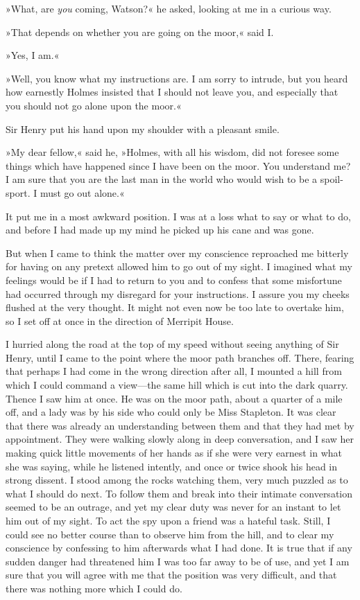 »What, are \emph{you} coming, Watson?« he asked, looking at me in a curious way.

»That depends on whether you are going on the moor,« said I.

»Yes, I am.«

»Well, you know what my instructions are. I am sorry to intrude, but you heard how earnestly Holmes insisted that I should not leave you, and especially that you should not go alone upon the moor.«

Sir Henry put his hand upon my shoulder with a pleasant smile.

»My dear fellow,« said he, »Holmes, with all his wisdom, did not foresee some things which have happened since I have been on the moor. You understand me? I am sure that you are the last man in the world who would wish to be a spoil-sport. I must go out alone.«

It put me in a most awkward position. I was at a loss what to say or what to do, and before I had made up my mind he picked up his cane and was gone.

But when I came to think the matter over my conscience reproached me bitterly for having on any pretext allowed him to go out of my sight. I imagined what my feelings would be if I had to return to you and to confess that some misfortune had occurred through my disregard for your instructions. I assure you my cheeks flushed at the very thought. It might not even now be too late to overtake him, so I set off at once in the direction of Merripit House.

I hurried along the road at the top of my speed without seeing anything of Sir Henry, until I came to the point where the moor path branches off. There, fearing that perhaps I had come in the wrong direction after all, I mounted a hill from which I could command a view\allowbreak---\allowbreak the same hill which is cut into the dark quarry. Thence I saw him at once. He was on the moor path, about a quarter of a mile off, and a lady was by his side who could only be Miss Stapleton. It was clear that there was already an understanding between them and that they had met by appointment. They were walking slowly along in deep conversation, and I saw her making quick little movements of her hands as if she were very earnest in what she was saying, while he listened intently, and once or twice shook his head in strong dissent. I stood among the rocks watching them, very much puzzled as to what I should do next. To follow them and break into their intimate conversation seemed to be an outrage, and yet my clear duty was never for an instant to let him out of my sight. To act the spy upon a friend was a hateful task. Still, I could see no better course than to observe him from the hill, and to clear my conscience by confessing to him afterwards what I had done. It is true that if any sudden danger had threatened him I was too far away to be of use, and yet I am sure that you will agree with me that the position was very difficult, and that there was nothing more which I could do.

